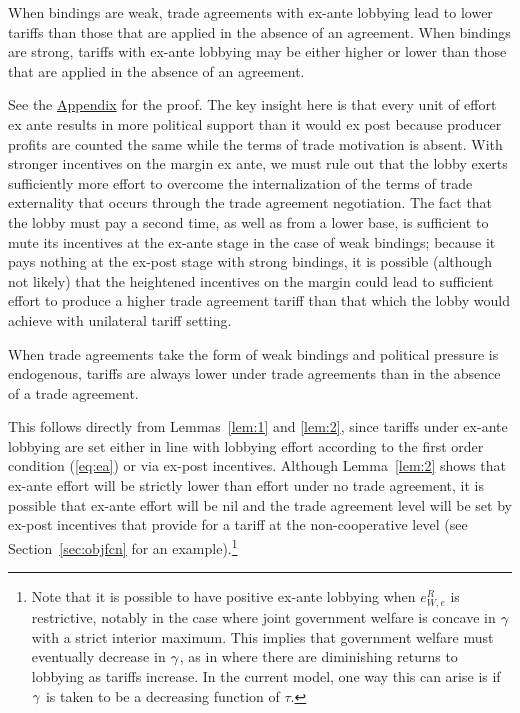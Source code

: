 \begin{lemma}
  When bindings are weak, trade agreements with ex-ante lobbying lead to lower tariffs than those that are applied in the absence of an agreement. When bindings are strong, tariffs with ex-ante lobbying may be either higher or lower than those that are applied in the absence of an agreement.
	\label{lem:2}
\end{lemma}

See the \hyperlink{lem1}{Appendix} for the proof. The key insight here is that every unit of effort ex ante results in more political support than it would ex post because producer profits are counted the same while the terms of trade motivation is absent. With stronger incentives on the margin ex ante, we must rule out that the lobby exerts sufficiently more effort to overcome the internalization of the terms of trade externality that occurs through the trade agreement negotiation. The fact that the lobby must pay a second time, as well as from a lower base, is sufficient to mute its incentives at the ex-ante stage in the case of weak bindings; because it pays nothing at the ex-post stage with strong bindings, it is possible (although not likely) that the heightened incentives on the margin could lead to sufficient effort to produce a higher trade agreement tariff than that which the lobby would achieve with unilateral tariff setting. 

\begin{proposition}
	When trade agreements take the form of weak bindings and political pressure is endogenous, tariffs are always lower under trade agreements than in the absence of a trade agreement. 
\end{proposition}

This follows directly from Lemmas~\ref{lem:1} and \ref{lem:2}, since tariffs under ex-ante lobbying are set either in line with lobbying effort according to the first order condition (\ref{eq:ea}) or via ex-post incentives. Although Lemma~\ref{lem:2} shows that ex-ante effort will be strictly lower than effort under no trade agreement, it is possible that ex-ante effort will be nil and the trade agreement level will be set by ex-post incentives that provide for a tariff at the non-cooperative level (see Section~\ref{sec:objfcn} for an example).\footnote{Note that it is possible to have positive ex-ante lobbying when $e^R_{W,e}$ is restrictive, notably in the case where joint government welfare is concave in $\gamma$ with a strict interior maximum. This implies that government welfare must eventually decrease in $\gamma$, as in \Textcite{ethier2012} where there are diminishing returns to lobbying as tariffs increase. In the current model, one way this can arise is if $\gamma$ is taken to be a decreasing function of $\tau$.}

